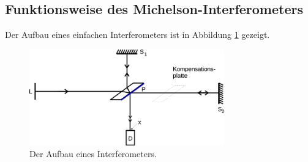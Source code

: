 \subsection{Funktionsweise des Michelson-Interferometers}

    Der Aufbau eines einfachen Interferometers ist in Abbildung \ref{fig:SchemaInterferometer} gezeigt.

    \begin{figure}
        \centering
        \includegraphics[width=0.75\textwidth]{content/img/Abb_4.pdf}
        \caption{Der Aufbau eines Interferometers.}
        \label{fig:SchemaInterferometer}
    \end{figure}

